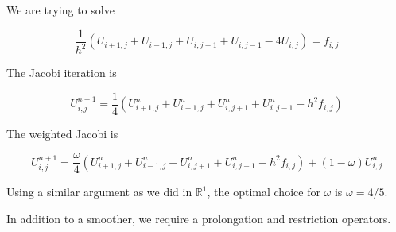 We are trying to solve

\begin{equation*}
  \frac{1}{h^2}\left(
    U_{i+1, j} + U_{i-1, j} + U_{i, j+1} + U_{i, j-1} - 4U_{i, j}
  \right)
   = f_{i,j}
\end{equation*}

The Jacobi iteration is

\begin{equation*}
    U_{i, j}^{n+1} =
    \frac{1}{4}\left(
    U_{i+1, j}^{n} + U_{i-1, j}^{n} + U_{i, j+1}^{n} + U_{i, j-1}^{n} -  h^2 f_{i,j}
      \right)
\end{equation*}

The weighted Jacobi is

\begin{equation*}
    U_{i, j}^{n+1} =
    \frac{\omega}{4}\left(
    U_{i+1, j}^{n} + U_{i-1, j}^{n} + U_{i, j+1}^{n} + U_{i, j-1}^{n} -  h^2 f_{i,j}
      \right) + (1-\omega)U_{i, j}^{n}
\end{equation*}

Using a similar argument as we did in $\mathbb{R}^1$, the optimal choice for
$\omega$ is $\omega=4/5$.


In addition to a smoother, we require a prolongation and restriction operators.


